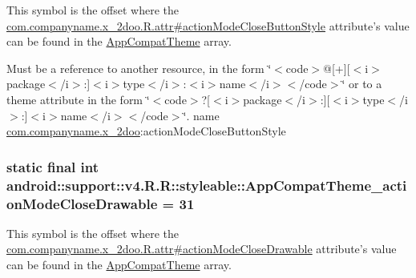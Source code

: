 This symbol is the offset where the \hyperlink{classcom_1_1companyname_1_1x__2doo_1_1_r_1_1attr_6666201c773ccc12e7bf6a567093ac2b}{com.companyname.x\_\-2doo.R.attr\#actionModeCloseButtonStyle} attribute's value can be found in the \hyperlink{classandroid_1_1support_1_1v4_1_1_r_1_1styleable_0873e92ba21076bb5a4aeadeb7f5779f}{AppCompatTheme} array.

Must be a reference to another resource, in the form \char`\"{}$<$code$>$@\mbox{[}+\mbox{]}\mbox{[}$<$i$>$package$<$/i$>$:\mbox{]}$<$i$>$type$<$/i$>$:$<$i$>$name$<$/i$>$$<$/code$>$\char`\"{} or to a theme attribute in the form \char`\"{}$<$code$>$?\mbox{[}$<$i$>$package$<$/i$>$:\mbox{]}\mbox{[}$<$i$>$type$<$/i$>$:\mbox{]}$<$i$>$name$<$/i$>$$<$/code$>$\char`\"{}.  name \hyperlink{namespacecom_1_1companyname_1_1x__2doo}{com.companyname.x\_\-2doo}:actionModeCloseButtonStyle \hypertarget{classandroid_1_1support_1_1v4_1_1_r_1_1styleable_b09f6cbf2975e5f044f4db1c3f5be82e}{
\subsubsection[{AppCompatTheme\_\-actionModeCloseDrawable}]{\setlength{\rightskip}{0pt plus 5cm}static final int android::support::v4.R.R::styleable::AppCompatTheme\_\-actionModeCloseDrawable = 31}}
\label{classandroid_1_1support_1_1v4_1_1_r_1_1styleable_b09f6cbf2975e5f044f4db1c3f5be82e}


This symbol is the offset where the \hyperlink{classcom_1_1companyname_1_1x__2doo_1_1_r_1_1attr_c9f4cb83c9e5be6f730b3dd34a9c04ad}{com.companyname.x\_\-2doo.R.attr\#actionModeCloseDrawable} attribute's value can be found in the \hyperlink{classandroid_1_1support_1_1v4_1_1_r_1_1styleable_0873e92ba21076bb5a4aeadeb7f5779f}{AppCompatTheme} array.

